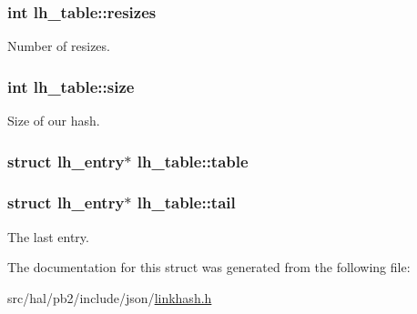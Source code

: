 \subsubsection[{\texorpdfstring{resizes}{resizes}}]{\setlength{\rightskip}{0pt plus 5cm}int lh\+\_\+table\+::resizes}\hypertarget{structlh__table_ab4cde49bd9ce7a07daaf99af34ddb67e}{}\label{structlh__table_ab4cde49bd9ce7a07daaf99af34ddb67e}
Number of resizes. 
\subsubsection[{\texorpdfstring{size}{size}}]{\setlength{\rightskip}{0pt plus 5cm}int lh\+\_\+table\+::size}\hypertarget{structlh__table_ae251575ec2935bcb0e0589ca8e243839}{}\label{structlh__table_ae251575ec2935bcb0e0589ca8e243839}
Size of our hash. 
\subsubsection[{\texorpdfstring{table}{table}}]{\setlength{\rightskip}{0pt plus 5cm}struct {\bf lh\+\_\+entry}$\ast$ lh\+\_\+table\+::table}\hypertarget{structlh__table_a4fd9c5aba38791b26ab0ec614a5caf8f}{}\label{structlh__table_a4fd9c5aba38791b26ab0ec614a5caf8f}
\subsubsection[{\texorpdfstring{tail}{tail}}]{\setlength{\rightskip}{0pt plus 5cm}struct {\bf lh\+\_\+entry}$\ast$ lh\+\_\+table\+::tail}\hypertarget{structlh__table_a479895e45db2bdf9bf5d173fa4b7e277}{}\label{structlh__table_a479895e45db2bdf9bf5d173fa4b7e277}
The last entry. 

The documentation for this struct was generated from the following file\+:\begin{DoxyCompactItemize}
\item 
src/hal/pb2/include/json/\hyperlink{linkhash_8h}{linkhash.\+h}\end{DoxyCompactItemize}

